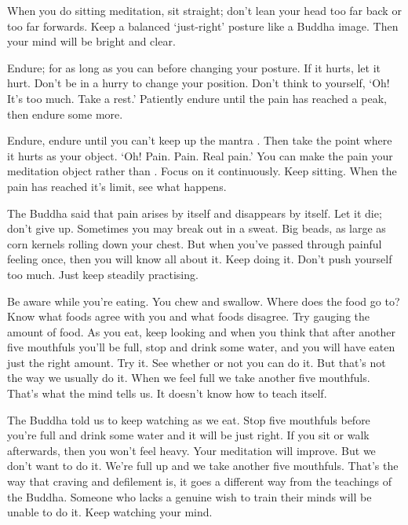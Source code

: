  When you do sitting meditation, sit straight; don't lean your head too far back or too far forwards. Keep a balanced `just-right' posture like a Buddha image. Then your mind will be bright and clear. 

 Endure; for as long as you can before changing your posture. If it hurts, let it hurt. Don't be in a hurry to change your position. Don't think to yourself, `Oh! It's too much. Take a rest.' Patiently endure until the pain has reached a peak, then endure some more. 

 Endure, endure until you can't keep up the mantra . Then take the point where it hurts as your object. `Oh! Pain. Pain. Real pain.' You can make the pain your meditation object rather than . Focus on it continuously. Keep sitting. When the pain has reached it's limit, see what happens. 

 The Buddha said that pain arises by itself and disappears by itself. Let it die; don't give up. Sometimes you may break out in a sweat. Big beads, as large as corn kernels rolling down your chest. But when you've passed through painful feeling once, then you will know all about it. Keep doing it. Don't push yourself too much. Just keep steadily practising. 

 Be aware while you're eating. You chew and swallow. Where does the food go to? Know what foods agree with you and what foods disagree. Try gauging the amount of food. As you eat, keep looking and when you think that after another five mouthfuls you'll be full, stop and drink some water, and you will have eaten just the right amount. Try it. See whether or not you can do it. But that's not the way we usually do it. When we feel full we take another five mouthfuls. That's what the mind tells us. It doesn't know how to teach itself. 

 The Buddha told us to keep watching as we eat. Stop five mouthfuls before you're full and drink some water and it will be just right. If you sit or walk afterwards, then you won't feel heavy. Your meditation will improve. But we don't want to do it. We're full up and we take another five mouthfuls. That's the way that craving and defilement is, it goes a different way from the teachings of the Buddha. Someone who lacks a genuine wish to train their minds will be unable to do it. Keep watching your mind. 

